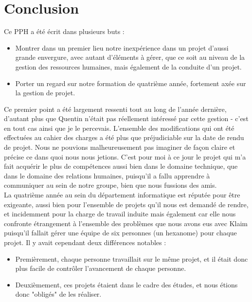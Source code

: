 \documentclass{article}
\begin{document}
	
\section{Conclusion}

		Ce PPH a été écrit dans plusieurs buts : 
		\begin{itemize}
			\item Montrer dans un premier lieu notre inexpérience dans un projet d'aussi grande envergure, avec autant d'éléments à gérer, que ce soit au niveau de la gestion des ressources humaines, mais également de la conduite d'un projet.
			\item Porter un regard sur notre formation de quatrième année, fortement axée sur la gestion de projet. \\
		\end{itemize}
		
		Ce premier point a été largement ressenti tout au long de l'année dernière, d'autant plus que Quentin n'était pas réellement intéressé par cette gestion - c'est en tout cas ainsi que je le percevais. L'ensemble des modifications qui ont été effectuées au cahier des charges a été plus que préjudiciable sur la date de rendu de projet. Nous ne pouvions malheureusement pas imaginer de façon claire et précise ce dans quoi nous nous jetions. C'est pour moi à ce jour le projet qui m'a fait acquérir le plus de compétences aussi bien dans le domaine technique, que dans le domaine des relations humaines, puisqu'il a fallu apprendre à communiquer au sein de notre groupe, bien que nous fussions des amis. \\
		
		La quatrième année au sein du département informatique est réputée pour être exigeante, aussi bien  pour l'ensemble de projets qu'il nous est demandé de rendre, et incidemment pour la charge de travail induite mais également car elle nous confronte étrangement à l'ensemble des problèmes que nous avons eus avec Klaim puisqu'il fallait gérer une équipe de six personnes (un hexanome) pour chaque projet. Il y avait cependant deux différences notables :
			\begin{itemize}
				\item Premièrement, chaque personne travaillait sur le même projet, et il était donc plus facile de contrôler l'avancement de chaque personne. 
				\item Deuxièmement, ces projets étaient dans le cadre des études, et nous étions donc "obligés" de les réaliser.\\
			\end{itemize}
		
\end{document}
